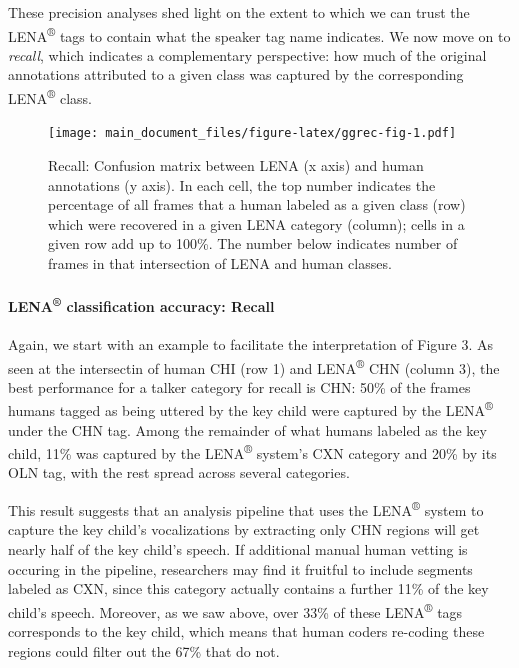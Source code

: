 \documentclass[english,table,man,floatsintext]{apa6}
\let\oldparagraph\paragraph
\renewcommand{\paragraph}[1]{\oldparagraph{#1}\mbox{}}
\begin{document}
These precision analyses shed light on the extent to which we can trust
the LENA\textsuperscript{®} tags to contain what the speaker tag name
indicates. We now move on to \emph{recall}, which indicates a
complementary perspective: how much of the original annotations
attributed to a given class was captured by the corresponding
LENA\textsuperscript{®} class.

\begin{figure}
\centering
\texttt{[image: main\_document\_files/figure-latex/ggrec-fig-1.pdf]}
\caption{\label{fig:ggrec-fig}Recall: Confusion matrix between LENA (x axis)
and human annotations (y axis). In each cell, the top number indicates
the percentage of all frames that a human labeled as a given class (row)
which were recovered in a given LENA category (column); cells in a given
row add up to 100\%. The number below indicates number of frames in that
intersection of LENA and human classes.}
\end{figure}

\paragraph{\texorpdfstring{LENA\textsuperscript{®} classification
accuracy:
Recall}{LENA® classification accuracy: Recall}}\label{lena-classification-accuracy-recall}

Again, we start with an example to facilitate the interpretation of
Figure 3. As seen at the intersectin of human CHI (row 1) and
LENA\textsuperscript{®} CHN (column 3), the best performance for a
talker category for recall is CHN: 50\% of the frames humans tagged as
being uttered by the key child were captured by the
LENA\textsuperscript{®} under the CHN tag. Among the remainder of what
humans labeled as the key child, 11\% was captured by the
LENA\textsuperscript{®} system's CXN category and 20\% by its OLN tag,
with the rest spread across several categories.

This result suggests that an analysis pipeline that uses the
LENA\textsuperscript{®} system to capture the key child's vocalizations
by extracting only CHN regions will get nearly half of the key child's
speech. If additional manual human vetting is occuring in the pipeline,
researchers may find it fruitful to include segments labeled as CXN,
since this category actually contains a further 11\% of the key child's
speech. Moreover, as we saw above, over 33\% of these
LENA\textsuperscript{®} tags corresponds to the key child, which means
that human coders re-coding these regions could filter out the 67\% that
do not.
\end{document}
